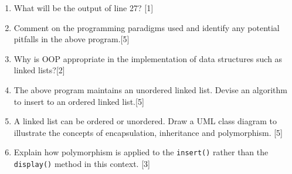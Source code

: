 \begin{enumerate}
\item What will be the output of line 27?\hfill{} {[}1{]}
\item Comment on the programming paradigms used and identify any potential
pitfalls in the above program.\hfill{}{[}5{]}
\item Why is OOP appropriate in the implementation of data structures such
as linked lists?\hfill{}{[}2{]}
\item The above program maintains an unordered linked list. Devise an algorithm
to insert to an ordered linked list.\hfill{}{[}5{]}
\item A linked list can be ordered or unordered. Draw a UML class diagram
to illustrate the concepts of encapsulation, inheritance and polymorphism.\hfill{}
{[}5{]}
\item Explain how polymorphism is applied to the \texttt{insert()} rather
than the \texttt{display()} method in this context.\hfill{} {[}3{]}
\end{enumerate}